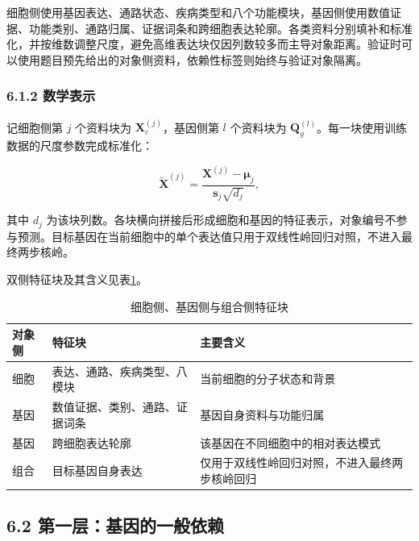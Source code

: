 细胞侧使用基因表达、通路状态、疾病类型和八个功能模块，基因侧使用数值证据、功能类别、通路归属、证据词条和跨细胞表达轮廓。各类资料分别填补和标准化，并按维数调整尺度，避免高维表达块仅因列数较多而主导对象距离。验证时可以使用题目预先给出的对象侧资料，依赖性标签则始终与验证对象隔离。

\hypertarget{612-ux6570ux5b66ux8868ux793a}{%
\subsubsection{6.1.2 数学表示}\label{612-ux6570ux5b66ux8868ux793a}}

记细胞侧第 \(j\) 个资料块为 \(\boldsymbol X_c^{(j)}\)，基因侧第 \(l\) 个资料块为 \(\boldsymbol Q_g^{(l)}\)。每一块使用训练数据的尺度参数完成标准化：

\begin{equation}
\label{eq:block-standardization}
\widetilde{\boldsymbol X}^{(j)}=
\frac{\boldsymbol X^{(j)}-\boldsymbol\mu_j}
{\boldsymbol s_j\sqrt{d_j}},
\end{equation}

其中 \(d_j\) 为该块列数。各块横向拼接后形成细胞和基因的特征表示，对象编号不参与预测。目标基因在当前细胞中的单个表达值只用于双线性岭回归对照，不进入最终两步核岭。

双侧特征块及其含义见表\ref{tab:feature-blocks}。

\begin{longtable}[]{@{}p{2.0cm}p{5.6cm}p{7.2cm}@{}}
\caption{细胞侧、基因侧与组合侧特征块}\label{tab:feature-blocks}\\
\toprule
对象侧 & 特征块 & 主要含义 \\
\midrule
\endhead
细胞 & 表达、通路、疾病类型、八模块 & 当前细胞的分子状态和背景 \\
基因 & 数值证据、类别、通路、证据词条 & 基因自身资料与功能归属 \\
基因 & 跨细胞表达轮廓 & 该基因在不同细胞中的相对表达模式 \\
组合 & 目标基因自身表达 & 仅用于双线性岭回归对照，不进入最终两步核岭回归 \\
\bottomrule
\end{longtable}

\hypertarget{62-ux7b2cux4e00ux5c42ux57faux56e0ux7684ux4e00ux822cux4f9dux8d56}{%
\subsection{6.2 第一层：基因的一般依赖}\label{62-ux7b2cux4e00ux5c42ux57faux56e0ux7684ux4e00ux822cux4f9dux8d56}}

